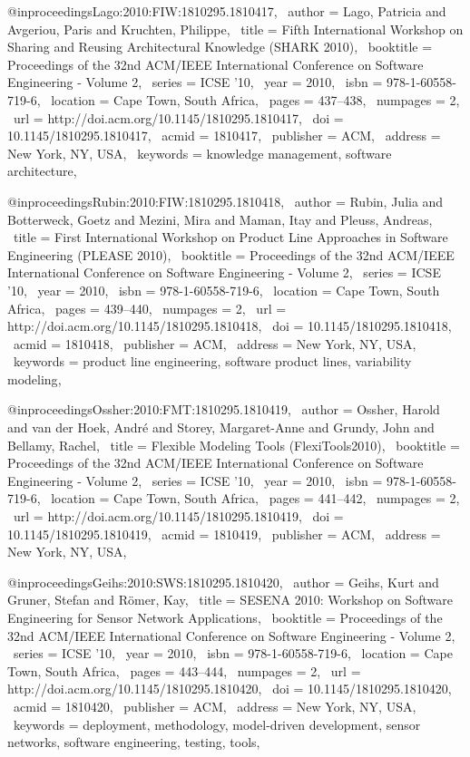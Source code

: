 @inproceedings{Lago:2010:FIW:1810295.1810417,
 author = {Lago, Patricia and Avgeriou, Paris and Kruchten, Philippe},
 title = {Fifth International Workshop on Sharing and Reusing Architectural Knowledge (SHARK 2010)},
 booktitle = {Proceedings of the 32nd ACM/IEEE International Conference on Software Engineering - Volume 2},
 series = {ICSE '10},
 year = {2010},
 isbn = {978-1-60558-719-6},
 location = {Cape Town, South Africa},
 pages = {437--438},
 numpages = {2},
 url = {http://doi.acm.org/10.1145/1810295.1810417},
 doi = {10.1145/1810295.1810417},
 acmid = {1810417},
 publisher = {ACM},
 address = {New York, NY, USA},
 keywords = {knowledge management, software architecture},
} 

@inproceedings{Rubin:2010:FIW:1810295.1810418,
 author = {Rubin, Julia and Botterweck, Goetz and Mezini, Mira and Maman, Itay and Pleuss, Andreas},
 title = {First International Workshop on Product Line Approaches in Software Engineering (PLEASE 2010)},
 booktitle = {Proceedings of the 32nd ACM/IEEE International Conference on Software Engineering - Volume 2},
 series = {ICSE '10},
 year = {2010},
 isbn = {978-1-60558-719-6},
 location = {Cape Town, South Africa},
 pages = {439--440},
 numpages = {2},
 url = {http://doi.acm.org/10.1145/1810295.1810418},
 doi = {10.1145/1810295.1810418},
 acmid = {1810418},
 publisher = {ACM},
 address = {New York, NY, USA},
 keywords = {product line engineering, software product lines, variability modeling},
} 

@inproceedings{Ossher:2010:FMT:1810295.1810419,
 author = {Ossher, Harold and van der Hoek, Andr{\'e} and Storey, Margaret-Anne and Grundy, John and Bellamy, Rachel},
 title = {Flexible Modeling Tools (FlexiTools2010)},
 booktitle = {Proceedings of the 32nd ACM/IEEE International Conference on Software Engineering - Volume 2},
 series = {ICSE '10},
 year = {2010},
 isbn = {978-1-60558-719-6},
 location = {Cape Town, South Africa},
 pages = {441--442},
 numpages = {2},
 url = {http://doi.acm.org/10.1145/1810295.1810419},
 doi = {10.1145/1810295.1810419},
 acmid = {1810419},
 publisher = {ACM},
 address = {New York, NY, USA},
} 

@inproceedings{Geihs:2010:SWS:1810295.1810420,
 author = {Geihs, Kurt and Gruner, Stefan and R\"{o}mer, Kay},
 title = {SESENA 2010: Workshop on Software Engineering for Sensor Network Applications},
 booktitle = {Proceedings of the 32nd ACM/IEEE International Conference on Software Engineering - Volume 2},
 series = {ICSE '10},
 year = {2010},
 isbn = {978-1-60558-719-6},
 location = {Cape Town, South Africa},
 pages = {443--444},
 numpages = {2},
 url = {http://doi.acm.org/10.1145/1810295.1810420},
 doi = {10.1145/1810295.1810420},
 acmid = {1810420},
 publisher = {ACM},
 address = {New York, NY, USA},
 keywords = {deployment, methodology, model-driven development, sensor networks, software engineering, testing, tools},
} 

